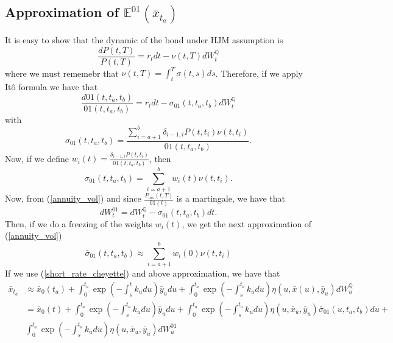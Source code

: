 \documentclass[a4paper,10pt]{article}
\newcommand{\1}{\mathbf{1}}
\begin{document}
\subsection{Approximation of $\mathbb{E}^{01}\left(\bar{x}_{t_a}\right)$}
It is easy to show that the dynamic of the bond under HJM assumption is
\begin{equation}
\frac{dP(t,T)}{P(t,T)} = r_t dt - \nu(t,T)dW^{\mathbb{Q}}_t  
\end{equation}
where we must rememebr that  $\nu(t,T)=\int_{t}^{T}\sigma(t,s) ds$. Therefore, if we apply Itô formula we have that 
\begin{equation}\label{annuity_spot_dynamic}
\frac{d01(t,t_a,t_b)}{01(t,t_a,t_b)} = r_t dt - \sigma_{01}(t,t_a,t_b)dW^{\mathbb{Q}}_t
\end{equation}
with 
\begin{equation} \label{annuity_vol}
\sigma_{01}(t,t_a,t_b) = \frac{\sum_{i=a+1}^{b} \delta_{i-1,i} P(t,t_i) \nu(t,t_i)}{01(t,t_a,t_b)}.
\end{equation}
Now, if we define $w_i(t)=\frac{\delta_{i-1,i} P(t,t_i)}{01(t,t_a,t_b)}$, then
\begin{equation*}
\sigma_{01}(t,t_a,t_b) = \sum_{i=a+1}^{b}  w_i(t) \nu(t,t_i).
\end{equation*}
Now, from (\ref{annuity_vol}) and since $\frac{P_{ois}(t,T)}{01(t)}$ is a martingale, we have that
\begin{equation*}
dW^{01}_t = dW^{\mathbb{Q}}_t - \sigma_{01}(t,t_a,t_b)dt. 
\end{equation*}
Then, if we do a freezing of the weights $w_i(t)$, we get the next approximation of (\ref{annuity_vol})
\begin{equation*} \label{approximation_o1_vol}
\bar{\sigma}_{01}(t,t_a,t_b) \approx \sum_{i=a+1}^{b} w_i(0) \nu(t,t_i)
\end{equation*}
If we use (\ref{short_rate_cheyette}) and above approximation, we have that
\begin{align}
\bar{x}_{t_a} &\approx \bar{x}_0(t_a)  + \int_{0}^{t_a} \exp\left(-\int_{s}^{t}k_u du\right) \bar{y}_u du + \int_{0}^{t_a}  \exp\left(-\int_{s}^{t_a}k_u du \right) \eta(u,\bar{x}(u),\bar{y}_u) dW_u^{\mathbb{Q}} \nonumber \\
&=  \bar{x}_0(t)  + \int_{0}^{t_a} \exp\left(-\int_{s}^{t_a}k_u du\right) \bar{y}_u du + \int_{0}^{t_a} \exp\left(-\int_{s}^{t_a}k_u du \right) \eta(u,\bar{x}_u,\bar{y}_u) \bar{\sigma}_{01}(u, t_a, t_b) du  + \nonumber \\ 
& \int_{0}^{t_a} \exp\left(-\int_{s}^{t_a}k_u du \right) \eta(u,\bar{x}_u,\bar{y}_u) dW_u^{01} 
\end{align}
\end{document}
